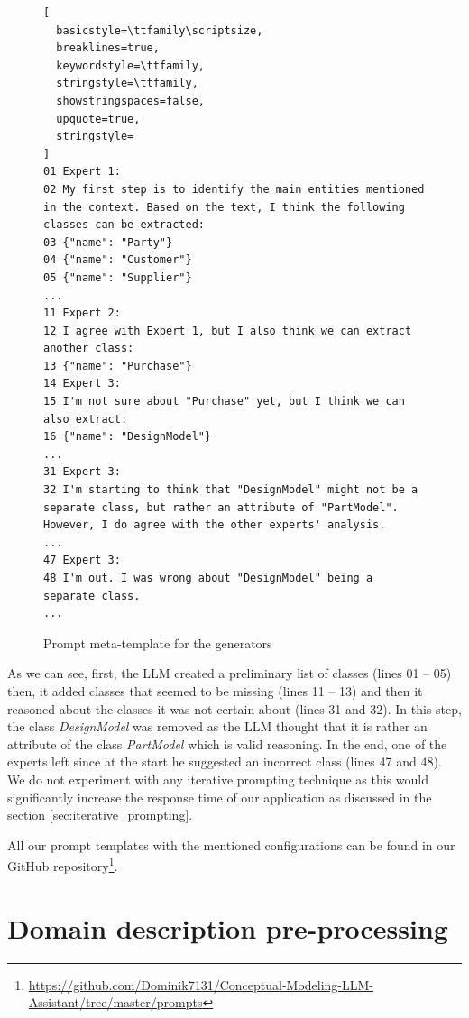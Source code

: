 \begin{figure}[!h]
    \centering
\begin{lstlisting}[
  basicstyle=\ttfamily\scriptsize,
  breaklines=true,
  keywordstyle=\ttfamily,
  stringstyle=\ttfamily,
  showstringspaces=false,
  upquote=true,
  stringstyle=
]
01 Expert 1:
02 My first step is to identify the main entities mentioned in the context. Based on the text, I think the following classes can be extracted:
03 {"name": "Party"}
04 {"name": "Customer"}
05 {"name": "Supplier"}
...
11 Expert 2:
12 I agree with Expert 1, but I also think we can extract another class:
13 {"name": "Purchase"}
14 Expert 3:
15 I'm not sure about "Purchase" yet, but I think we can also extract:
16 {"name": "DesignModel"}
...
31 Expert 3:
32 I'm starting to think that "DesignModel" might not be a separate class, but rather an attribute of "PartModel". However, I do agree with the other experts' analysis.
...
47 Expert 3:
48 I'm out. I was wrong about "DesignModel" being a separate class.
...

\end{lstlisting}
    \caption{\centering Prompt meta-template for the generators}
    \label{fig:meta-templates}
\end{figure}



As we can see, first, the LLM created a preliminary list of classes (lines 01 -- 05) then, it added classes that seemed to be missing (lines 11 -- 13) and then it reasoned about the classes it was not certain about (lines 31 and 32). In this step, the class \textit{DesignModel} was removed as the LLM thought that it is rather an attribute of the class \textit{PartModel} which is valid reasoning. In the end, one of the experts left since at the start he suggested an incorrect class (lines 47 and 48). \\

We do not experiment with any iterative prompting technique as this would significantly increase the response time of our application as discussed in the section \ref{sec:iterative_prompting}.

All our prompt templates with the mentioned configurations can be found in our GitHub repository\footnote{\url{https://github.com/Dominik7131/Conceptual-Modeling-LLM-Assistant/tree/master/prompts}}.


\section{Domain description pre-processing}

